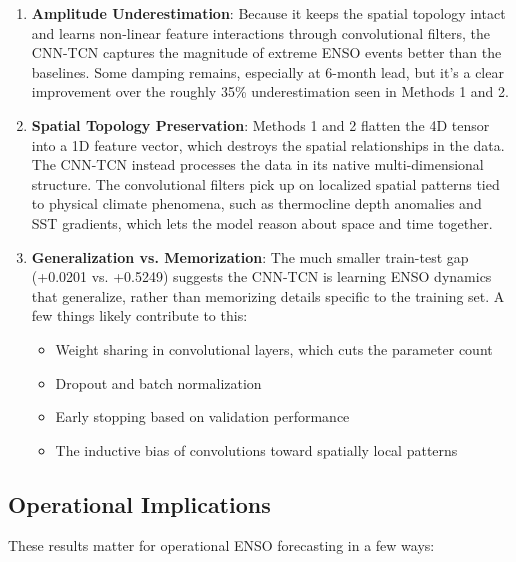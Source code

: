 \begin{enumerate}
    \item \textbf{Amplitude Underestimation}: Because it keeps the spatial topology intact and learns non-linear feature interactions through convolutional filters, the CNN-TCN captures the magnitude of extreme ENSO events better than the baselines. Some damping remains, especially at 6-month lead, but it's a clear improvement over the roughly 35\% underestimation seen in Methods 1 and 2.

    \item \textbf{Spatial Topology Preservation}: Methods 1 and 2 flatten the 4D tensor into a 1D feature vector, which destroys the spatial relationships in the data. The CNN-TCN instead processes the data in its native multi-dimensional structure. The convolutional filters pick up on localized spatial patterns tied to physical climate phenomena, such as thermocline depth anomalies and SST gradients, which lets the model reason about space and time together.

    \item \textbf{Generalization vs. Memorization}: The much smaller train-test gap (+0.0201 vs. +0.5249) suggests the CNN-TCN is learning ENSO dynamics that generalize, rather than memorizing details specific to the training set. A few things likely contribute to this:
    \begin{itemize}
        \item Weight sharing in convolutional layers, which cuts the parameter count
        \item Dropout and batch normalization
        \item Early stopping based on validation performance
        \item The inductive bias of convolutions toward spatially local patterns
    \end{itemize}
\end{enumerate}

\subsection{Operational Implications}
These results matter for operational ENSO forecasting in a few ways:

